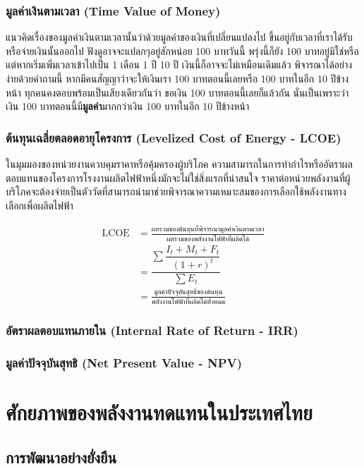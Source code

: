 \message{ !name(solar.tex)}\documentclass[
a4paper,
svgnames,
openany,
justified,
]{tufte-book}
\begin{document}
\section{มูลค่าเงินตามเวลา (Time Value of Money)}

แนวคิดเรื่องของมูลค่าเงินตามเวลานั้นว่าด้วยมูลค่าของเงินที่เปลี่ยนแปลงไป ขึ้นอยู่กับเวลาที่เราได้รับหรือจ่ายเงินนั้นออกไป ฟังดูอาจจะแปลกๆอยู่สักหน่อย 100 บาทวันนี้ พรุ่งนี้ก็ยัง 100 บาทอยู่มิใช่หรือ แต่หากเริ่มเพิ่มเวลาเข้าไปเป็น 1 เดือน 1 ปี 10 ปี เงินนี้ก็อาจจะไม่เหมือนเดิมแล้ว พิจารณาได้อย่างง่ายด้วยคำถามนี้ หากมีคนสัญญาว่าจะให้เงินเรา 100 บาทตอนนี้เลยหรือ 100 บาทในอีก 10 ปีข้างหน้า ทุกคนคงตอบพร้อมเป็นเสียงเดียวกันว่า ขอเงิน 100 บาทตอนนี้เลยก็แล้วกัน นั่นเป็นเพราะว่าเงิน 100 บาทตอนนี้มี\textbf{มูลค่า}มากกว่าเงิน 100 บาทในอีก 10 ปีข้างหน้า

\section{ต้นทุนเฉลี่ยตลอดอายุโครงการ (Levelized Cost of Energy - LCOE)}

ในมุมมองของหน่วยงานควบคุมราคาหรือคุ้มครองผู้บริโภค ความสามารถในการทำกำไรหรืออัตราผลตอบแทนของโครงการโรงงานผลิตไฟฟ้าหนึ่งมักจะไม่ใช่สิ่งแรกที่น่าสนใจ ราคาต่อหน่วยพลังงานที่ผู้บริโภคจะต้องจ่ายเป็นตัววัดที่สามารถนำมาช่วยพิจารณาความเหมาะสมของการเลือกใช้พลังงานทางเลือกเพื่อผลิตไฟฟ้า

\begin{align}
  \label{eq:LCOE}
  \text{LCOE} &= \frac{\text{ผลรวมของต้นทุนที่พิจารณามูลค่าเงินตามเวลา}}{\text{ผลรวมของพลังงานไฟฟ้าที่ผลิตได้}} \\[10pt]
              &= \dfrac{\sum \dfrac{I_t + M_t + F_t}{(1+r)^t}}{\sum E_t} \\[10pt]
              &= \frac{\text{มูลค่าปัจจุบันสุทธิของต้นทุน}}{\text{พลังงานไฟฟ้าที่ผลิตได้ทั้งหมด}}
\end{align}

\section{อัตราผลตอบแทนภายใน (Internal Rate of Return - IRR)}

\section{มูลค่าปัจจุบันสุทธิ (Net Present Value - NPV)}

\part{ศักยภาพของพลังงานทดแทนในประเทศไทย}

\chapter{การพัฒนาอย่างยั่งยืน}

\backmatter
\end{document}

